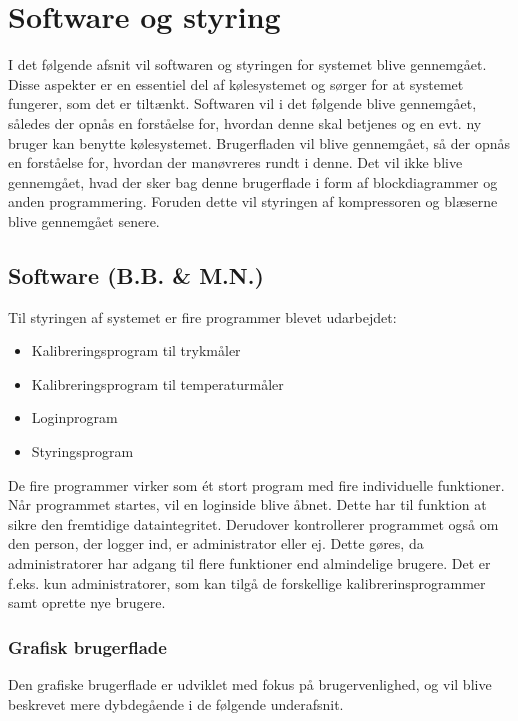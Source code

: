 \documentclass[../Hovedrapport.tex]{subfiles}
\begin{document}
\chapter{Software og styring}
    \label{sec:Software og styring}
I det følgende afsnit vil softwaren og styringen for systemet blive gennemgået. Disse aspekter er en essentiel del af kølesystemet og sørger for at systemet fungerer, som det er tiltænkt. Softwaren vil i det følgende blive gennemgået, således der opnås en forståelse for, hvordan denne skal betjenes og en evt. ny bruger kan benytte kølesystemet. Brugerfladen vil blive gennemgået, så der opnås en forståelse for, hvordan der manøvreres rundt i denne. Det vil ikke blive gennemgået, hvad der sker bag denne brugerflade i form af blockdiagrammer og anden programmering. Foruden dette vil styringen af kompressoren og blæserne blive gennemgået senere.


\section{Software (B.B. \& M.N.)}
Til styringen af systemet er fire programmer blevet udarbejdet: 
\begin{itemize}
    \item Kalibreringsprogram til trykmåler
    \item Kalibreringsprogram til temperaturmåler
    \item Loginprogram
    \item Styringsprogram
\end{itemize}
De fire programmer virker som ét stort program med fire individuelle funktioner. Når programmet startes, vil en loginside blive åbnet. Dette har til funktion at sikre den fremtidige dataintegritet. Derudover kontrollerer programmet også om den person, der logger ind, er administrator eller ej. Dette gøres, da administratorer har adgang til flere funktioner end almindelige brugere.
Det er f.eks. kun administratorer, som kan tilgå de forskellige kalibrerinsprogrammer samt oprette nye brugere.
\subsection*{Grafisk brugerflade}
    \label{sec:grafisk_bruger}
Den grafiske brugerflade er udviklet med fokus på brugervenlighed, og vil blive beskrevet mere dybdegående i de følgende underafsnit.
\end{document}
